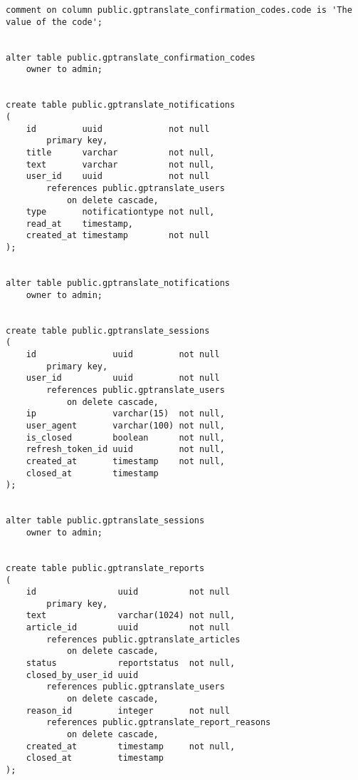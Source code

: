 \begin{lstlisting}
comment on column public.gptranslate_confirmation_codes.code is 'The value of the code';


alter table public.gptranslate_confirmation_codes
    owner to admin;


create table public.gptranslate_notifications
(
    id         uuid             not null
        primary key,
    title      varchar          not null,
    text       varchar          not null,
    user_id    uuid             not null
        references public.gptranslate_users
            on delete cascade,
    type       notificationtype not null,
    read_at    timestamp,
    created_at timestamp        not null
);


alter table public.gptranslate_notifications
    owner to admin;


create table public.gptranslate_sessions
(
    id               uuid         not null
        primary key,
    user_id          uuid         not null
        references public.gptranslate_users
            on delete cascade,
    ip               varchar(15)  not null,
    user_agent       varchar(100) not null,
    is_closed        boolean      not null,
    refresh_token_id uuid         not null,
    created_at       timestamp    not null,
    closed_at        timestamp
);


alter table public.gptranslate_sessions
    owner to admin;


create table public.gptranslate_reports
(
    id                uuid          not null
        primary key,
    text              varchar(1024) not null,
    article_id        uuid          not null
        references public.gptranslate_articles
            on delete cascade,
    status            reportstatus  not null,
    closed_by_user_id uuid
        references public.gptranslate_users
            on delete cascade,
    reason_id         integer       not null
        references public.gptranslate_report_reasons
            on delete cascade,
    created_at        timestamp     not null,
    closed_at         timestamp
);



\end{lstlisting}
